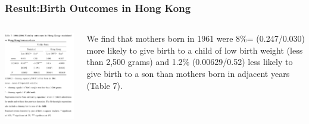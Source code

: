 \documentclass{beamer}
\begin{document}
\begin{frame}
\frametitle{Result:Birth Outcomes in Hong Kong}
    \begin{columns}
            \begin{minipage}[c][0.4\textheight][c]{\linewidth}
                \centering
                \includegraphics[width=1\linewidth]{table7}
            \end{minipage}
           
            \begin{minipage}[c][0.4\textheight][c]{\linewidth}
            We ﬁnd that mothers born in 1961 were 8\%= (0.247/0.030) more likely to give birth to a child of low birth weight (less than 2,500 grams) and 1.2\% (0.00629/0.52) less likely to give birth to a son than mothers born in adjacent years (Table 7).
            \end{minipage}
    \end{columns}
\end{frame}
\end{document}

